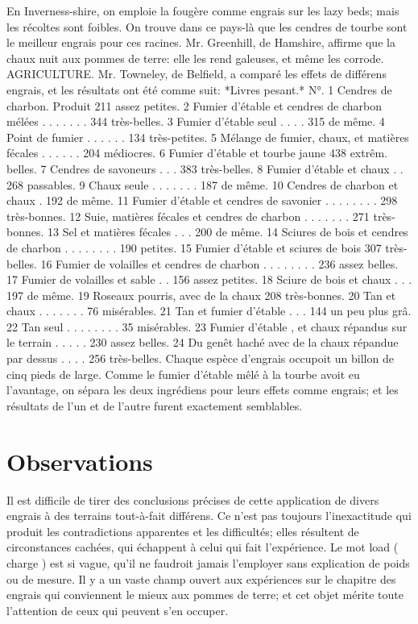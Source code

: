 En Inverness-shire, on emploie la fougère comme engrais sur les lazy beds; mais les récoltes sont foibles. On trouve dans ce pays-là que les cendres de tourbe sont le meilleur engrais pour ces racines.
Mr. Greenhill, de Hamshire, affirme que la chaux nuit aux pommes de terre: elle les rend galeuses, et même les corrode.\setcounter{page}{282} AGRICULTURE.
Mr. Towneley, de Belfield, a comparé
les effets de différens engrais, et les résultats
ont été comme suit:
*Livres pesant.*
N°. 1 Cendres de charbon. Produit 211 assez petites.
2 Fumier d'étable et cendres de
charbon mélées . . . . . . . 344 très-belles.
3 Fumier d'étable seul . . . . 315 de même.
4 Point de fumier . . . . . . 134 très-petites.
5 Mélange de fumier, chaux, et
matières fécales . . . . . . 204 médiocres.
6 Fumier d'étable et tourbe jaune 438 extrêm. belles.
7 Cendres de savoneurs . . . 383 très-belles.
8 Fumier d'étable et chaux . . 268 passables.
9 Chaux seule . . . . . . . 187 de même.
10 Cendres de charbon et chaux . 192 de même.
11 Fumier d'étable et cendres de
savonier . . . . . . . . 298 très-bonnes.
12 Suie, matières fécales et cendres
de charbon . . . . . . . 271 très-bonnes.
13 Sel et matières fécales . . . 200 de même.
14 Sciures de bois et cendres de
charbon . . . . . . . . 190 petites.
15 Fumier d'étable et sciures de bois 307 très-belles.
16 Fumier de volailles et cendres de
charbon . . . . . . . . 236 assez belles.
17 Fumier de volailles et sable . . 156 assez petites.
18 Sciure de bois et chaux . . . 197 de même.
19 Roseaux pourris, avec de la chaux 208 très-bonnes.
20 Tan et chaux . . . . . . . 76 misérables.
21 Tan et fumier d'étable . . . 144 un peu plus grâ.
22 Tan seul . . . . . . . . 35 misérables.
23 Fumier d'étable , et chaux répandus sur le terrain . . . . . 230 assez belles.
24 Du genêt haché avec de la chaux
répandue par dessus . . . . 256 très-belles.\setcounter{page}{283} Chaque espèce d'engrais occupoit un billon de cinq pieds de large. Comme le fumier d'étable mêlé à la tourbe avoit eu l'avantage, on sépara les deux ingrédiens pour leurs effets comme engrais; et les résultats de l'un et de l'autre furent exactement semblables.
\section{Observations}
Il est difficile de tirer des conclusions précises de cette application de divers engrais à des terrains tout-à-fait différens. Ce n'est pas toujours l'inexactitude qui produit les contradictions apparentes et les difficultés; elles résultent de circonstances cachées, qui échappent à celui qui fait l'expérience. Le mot load ( charge ) est si vague, qu'il ne faudroit jamais l'employer sans explication de poids ou de mesure. Il y a un vaste champ ouvert aux expériences sur le chapitre des engrais qui conviennent le mieux aux pommes de terre; et cet objet mérite toute l'attention de ceux qui peuvent s'en occuper.
